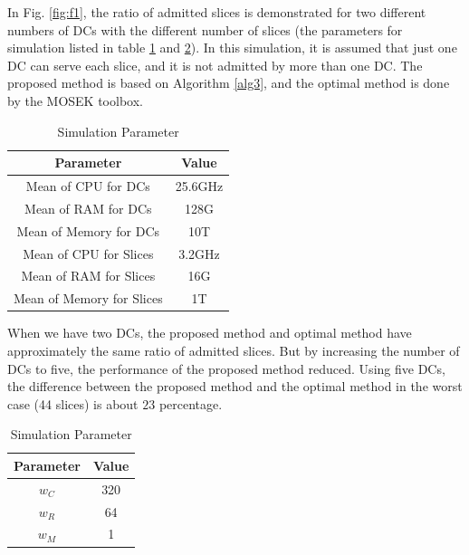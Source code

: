 \documentclass[conference]{IEEEtran}
\begin{document}
In Fig. \ref{fig:f1}, the ratio of admitted slices is demonstrated for two different numbers of DCs with the different number of slices (the parameters for simulation listed in table \ref{table:1} and \ref{table:2}). In this simulation, it is assumed that  just one DC can serve each slice, and it is not admitted by more than one DC. The proposed method is based on Algorithm \ref{alg3}, and the optimal method is done by the MOSEK toolbox.
 \begin{table}
 \caption {Simulation Parameter} \label{table:1} 
 \begin{center}
  \begin{tabular}{||c c ||} 
  \hline
  Parameter & Value \\ [0.5ex] 
  \hline\hline
  Mean of CPU for DCs & 25.6GHz\\
  \hline
  Mean of RAM for DCs & 128G\\
  \hline
 Mean of Memory for DCs & 10T \\
  \hline
   Mean of CPU for Slices & 3.2GHz\\
  \hline
  Mean of RAM for Slices & 16G\\
  \hline
 Mean of Memory for Slices & 1T \\ [1ex] 
  \hline
 \end{tabular}
 \end{center}
 \end{table}
When we have two DCs, the proposed method and optimal method have approximately the same ratio of admitted slices. But by increasing the number of DCs to five, the performance of the proposed method reduced. Using five DCs, the difference between the
proposed method and the optimal method in the worst case (44 slices) is about $23$ percentage. 
 \begin{table}
 \caption {Simulation Parameter} \label{table:2} 
 \begin{center}
  \begin{tabular}{||c c ||} 
  \hline
  Parameter & Value \\ [0.5ex] 
  \hline\hline
   $w_C$ & 320\\
  \hline
  $w_R$  & 64\\
  \hline
 $w_M$  & 1 \\ [1ex] 
  \hline
 \end{tabular}
 \end{center}
 \end{table}
\end{document}
